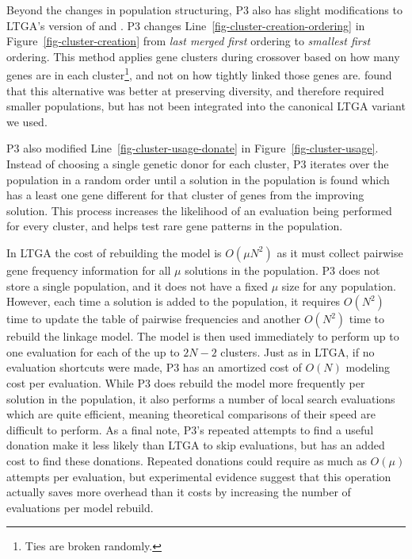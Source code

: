 \documentclass[twoside]{article}
\begin{document}
Beyond the changes in population structuring, P3 also has slight modifications to
LTGA's version of  and .
P3 changes Line~\ref{fig-cluster-creation-ordering} in Figure~\ref{fig-cluster-creation}
from \emph{last merged first} ordering to \emph{smallest first} ordering.
This method applies gene clusters during crossover based on how many genes
are in each cluster\footnote{Ties are broken randomly.}, and not on how tightly linked those genes are.
\cite{goldman:2012:ltga} found that this alternative was better at preserving
diversity, and therefore required smaller populations, but has  not been integrated into
the canonical LTGA variant we used.

P3 also modified Line~\ref{fig-cluster-usage-donate} in Figure~\ref{fig-cluster-usage}.
Instead of choosing a single genetic donor for each cluster, P3 iterates over the
population in a random order until a solution in the population is found which
has a least one gene different for that cluster of genes from the improving solution.
This process increases the likelihood of an evaluation being performed for every cluster,
and helps test rare gene patterns in the population.

In LTGA the cost of rebuilding the model is $O(\mu N^2)$ as it must collect pairwise
gene frequency information for all $\mu$ solutions in the population. P3 does not store
a single population, and it does not have a fixed $\mu$ size for any population. However,
each time a solution is added to the population, it requires $O(N^2)$ time to update
the table of pairwise frequencies and another $O(N^2)$ time to rebuild the linkage model.
The model is then used immediately to perform up to one evaluation for each of the up
to $2N-2$ clusters. Just as in LTGA, if no evaluation shortcuts were made, P3
has an amortized cost of $O(N)$ modeling cost per evaluation. While P3 does
rebuild the model more frequently per solution in the population, it also performs
a number of local search evaluations which are quite efficient, meaning theoretical
comparisons of their speed are difficult to perform. As a final note, P3's repeated
attempts to find a useful donation make it less likely than LTGA to skip evaluations,
but has an added cost to find these donations. Repeated donations could require as much
as $O(\mu)$ attempts per evaluation, but experimental evidence suggest that this
operation actually saves more overhead than it costs by increasing the number of evaluations
per model rebuild.
\end{document}
